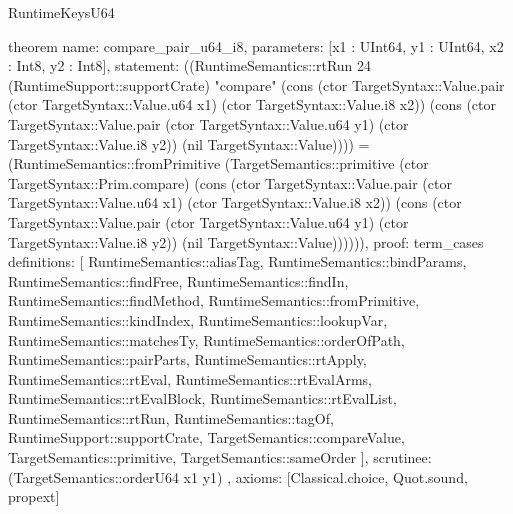 \begin{lexlean}{RuntimeKeysU64}
\begin{semanticmodule}
theorem{
  name: compare_pair_u64_i8,
  parameters: [x1 : UInt64, y1 : UInt64, x2 : Int8, y2 : Int8],
  statement: ((RuntimeSemantics::rtRun 24 (RuntimeSupport::supportCrate) "compare" (cons (ctor TargetSyntax::Value.pair (ctor TargetSyntax::Value.u64 x1) (ctor TargetSyntax::Value.i8 x2)) (cons (ctor TargetSyntax::Value.pair (ctor TargetSyntax::Value.u64 y1) (ctor TargetSyntax::Value.i8 y2)) (nil TargetSyntax::Value)))) = (RuntimeSemantics::fromPrimitive (TargetSemantics::primitive (ctor TargetSyntax::Prim.compare) (cons (ctor TargetSyntax::Value.pair (ctor TargetSyntax::Value.u64 x1) (ctor TargetSyntax::Value.i8 x2)) (cons (ctor TargetSyntax::Value.pair (ctor TargetSyntax::Value.u64 y1) (ctor TargetSyntax::Value.i8 y2)) (nil TargetSyntax::Value)))))),
  proof: term_cases{
    definitions: [
      RuntimeSemantics::aliasTag,
      RuntimeSemantics::bindParams,
      RuntimeSemantics::findFree,
      RuntimeSemantics::findIn,
      RuntimeSemantics::findMethod,
      RuntimeSemantics::fromPrimitive,
      RuntimeSemantics::kindIndex,
      RuntimeSemantics::lookupVar,
      RuntimeSemantics::matchesTy,
      RuntimeSemantics::orderOfPath,
      RuntimeSemantics::pairParts,
      RuntimeSemantics::rtApply,
      RuntimeSemantics::rtEval,
      RuntimeSemantics::rtEvalArms,
      RuntimeSemantics::rtEvalBlock,
      RuntimeSemantics::rtEvalList,
      RuntimeSemantics::rtRun,
      RuntimeSemantics::tagOf,
      RuntimeSupport::supportCrate,
      TargetSemantics::compareValue,
      TargetSemantics::primitive,
      TargetSemantics::sameOrder
    ],
    scrutinee: (TargetSemantics::orderU64 x1 y1)
  },
  axioms: [Classical.choice, Quot.sound, propext]
}


\end{semanticmodule}
\end{lexlean}
